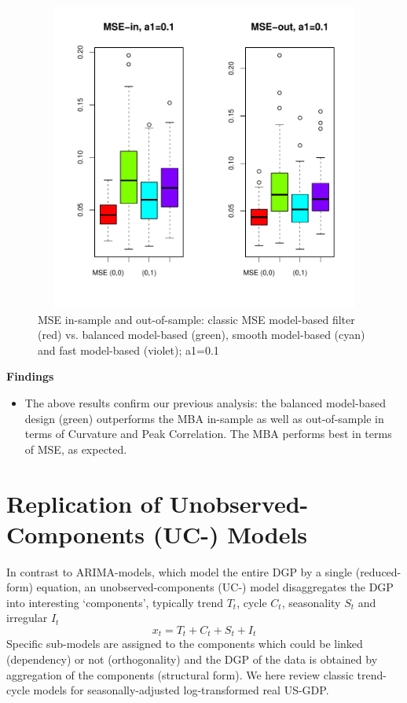 \documentclass[a4paper]{book}
\begin{document}
\begin{figure}[H]\begin{center}\includegraphics[height=4in, width=6in]{z_replication_curv_peak_dfa_2_emp_mse}\caption{MSE in-sample and out-of-sample: classic MSE model-based filter (red) vs. balanced model-based (green), smooth model-based (cyan) and fast model-based (violet);  a1=0.1\label{z_replication_curv_peak_dfa_2_emp_mse}}\end{center}\end{figure}
\textbf{Findings}
\begin{itemize}
\item The above results confirm our previous analysis: the balanced model-based design (green) outperforms the MBA in-sample as well as out-of-sample in terms of Curvature and Peak Correlation. The MBA performs best in terms of MSE, as expected.
\end{itemize}




\section{Replication of Unobserved-Components (UC-) Models}\label{rep_cust_us_mod}

In contrast to ARIMA-models, which model the entire DGP by a single (reduced-form) equation, an unobserved-components (UC-) model disaggregates the DGP into interesting `components', typically trend $T_t$, cycle $C_t$, seasonality $S_t$ and irregular $I_t$
\[x_t=T_t+C_t+S_t+I_t\]
Specific sub-models are assigned to the components which could be linked (dependency) or not (orthogonality) and the DGP of the data is obtained by aggregation of the components (structural form). We here review classic trend-cycle models for seasonally-adjusted log-transformed real US-GDP. 
\end{document}
